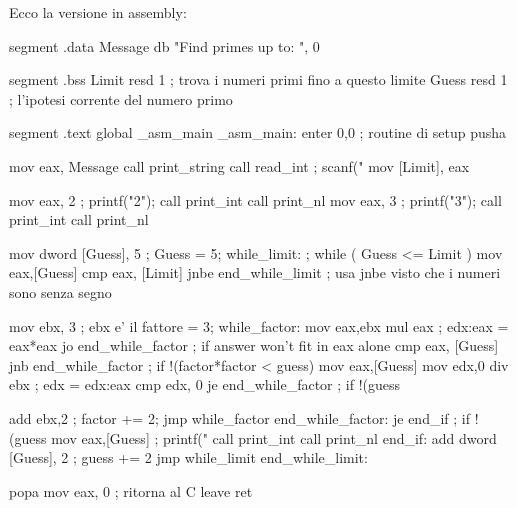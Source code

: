 Ecco la versione in assembly:
\begin{AsmCodeListing}[label=prime.asm]
segment .data
Message         db      "Find primes up to: ", 0

segment .bss
Limit           resd    1               ; trova i numeri primi fino a questo limite
Guess           resd    1               ; l'ipotesi corrente del numero primo

segment .text
        global  _asm_main
_asm_main:
        enter   0,0               ; routine di setup 
        pusha

        mov     eax, Message
        call    print_string
        call    read_int             ; scanf("%
        mov     [Limit], eax

        mov     eax, 2               ; printf("2\n");
        call    print_int
        call    print_nl
        mov     eax, 3               ; printf("3\n");
        call    print_int
        call    print_nl

        mov     dword [Guess], 5     ; Guess = 5;
while_limit:                         ; while ( Guess <= Limit )
        mov     eax,[Guess]
        cmp     eax, [Limit]
        jnbe    end_while_limit      ; usa jnbe visto che i numeri sono senza segno

        mov     ebx, 3               ; ebx e' il fattore = 3;
while_factor:
        mov     eax,ebx
        mul     eax                  ; edx:eax = eax*eax
        jo      end_while_factor     ; if answer won't fit in eax alone
        cmp     eax, [Guess]
        jnb     end_while_factor     ; if !(factor*factor < guess)
        mov     eax,[Guess]
        mov     edx,0
        div     ebx                  ; edx = edx:eax %
        cmp     edx, 0
        je      end_while_factor     ; if !(guess %

        add     ebx,2                ; factor += 2;
        jmp     while_factor
end_while_factor:
        je      end_if               ; if !(guess %
        mov     eax,[Guess]          ; printf("%
        call    print_int
        call    print_nl
end_if:
        add     dword [Guess], 2     ; guess += 2
        jmp     while_limit
end_while_limit:

        popa
        mov     eax, 0            ; ritorna al C
        leave                     
        ret
\end{AsmCodeListing}
